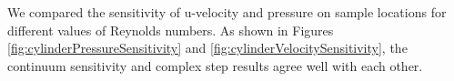 \documentclass[12pt]{aiaa-pretty}
\begin{document}
We compared the sensitivity of u-velocity and pressure on sample locations for different values of Reynolds numbers. As shown in Figures \ref{fig:cylinderPressureSensitivity} and \ref{fig:cylinderVelocitySensitivity}, the continuum sensitivity and complex step results agree well with each other.

%
\begin{figure}[H]
	\centering
	\quad
	\\
	\quad
	\\

\end{figure}
\end{document}
